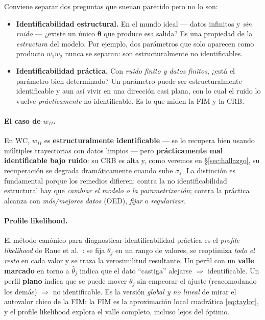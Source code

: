 \documentclass[11pt,a4paper]{article}
\newcommand{\thetavec}{\bm{\theta}}
\begin{document}
Conviene separar dos preguntas que suenan parecido pero no lo son:
\begin{itemize}[nosep]
  \item \textbf{Identificabilidad estructural.} En el mundo ideal --- datos infinitos y \emph{sin ruido} --- ¿existe un único $\thetavec$ que produce esa salida? Es una propiedad de la \emph{estructura} del modelo. Por ejemplo, dos parámetros que solo aparecen como producto $w_1 w_2$ nunca se separan: son estructuralmente no identificables.
  \item \textbf{Identificabilidad práctica.} Con \emph{ruido finito y datos finitos}, ¿está el parámetro bien determinado? Un parámetro puede ser estructuralmente identificable y aun así vivir en una dirección casi plana, con lo cual el ruido lo vuelve \emph{prácticamente} no identificable. Es lo que miden la FIM y la CRB.
\end{itemize}

\paragraph{El caso de $w_{II}$.} En WC, $w_{II}$ es \textbf{estructuralmente identificable} --- se lo recupera bien usando múltiples trayectorias con datos limpios --- pero \textbf{prácticamente mal identificable bajo ruido}: su CRB es alta y, como veremos en \S\ref{sec:hallazgo}, su recuperación se degrada dramáticamente cuando sube $\sigma_\varepsilon$. La distinción es fundamental porque los remedios difieren: contra la no identificabilidad estructural hay que \emph{cambiar el modelo o la parametrización}; contra la práctica alcanza con \emph{más/mejores datos} (OED), \emph{fijar} o \emph{regularizar}.

\paragraph{Profile likelihood.} El método canónico para diagnosticar identificabilidad práctica es el \emph{profile likelihood} de Raue et al.\ \cite{raue2009}: se fija $\theta_j$ en un rango de valores, se reoptimiza \emph{todo el resto} en cada valor y se traza la verosimilitud resultante. Un perfil con un \textbf{valle marcado} en torno a $\hat\theta_j$ indica que el dato ``castiga'' alejarse $\Rightarrow$ identificable. Un perfil \textbf{plano} indica que se puede mover $\theta_j$ sin empeorar el ajuste (reacomodando los demás) $\Rightarrow$ no identificable. Es la versión \emph{global y no lineal} de mirar el autovalor chico de la FIM: la FIM es la aproximación local cuadrática \eqref{eq:taylor}, y el profile likelihood explora el valle completo, incluso lejos del óptimo.
\end{document}
